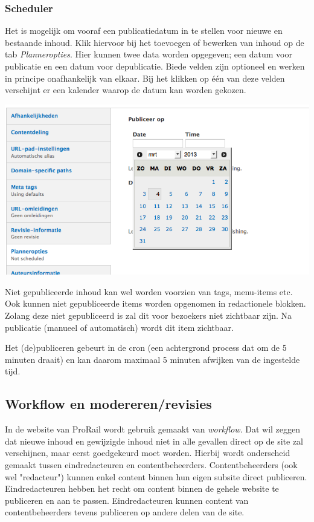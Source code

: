 \subsubsection{Scheduler}
Het is mogelijk om vooraf een publicatiedatum in te stellen voor nieuwe en bestaande inhoud. Klik hiervoor bij het toevoegen of bewerken van inhoud op de tab \emph{Planneropties}. Hier kunnen twee data worden opgegeven; een datum voor publicatie en een datum voor depublicatie. Biede velden zijn optioneel en werken in principe onafhankelijk van elkaar. Bij het klikken op \'{e}\'{e}n van deze velden verschijnt er een kalender waarop de datum kan worden gekozen.
\begin{center}
\includegraphics[width=\textwidth]{img/scheduler.png}
\end{center}
Niet gepubliceerde inhoud kan wel worden voorzien van tags, menu-items etc. Ook kunnen niet gepubliceerde items worden opgenomen in redactionele blokken. Zolang deze niet gepubliceerd is zal dit voor bezoekers niet zichtbaar zijn. Na publicatie (manueel of automatisch) wordt dit item zichtbaar.

Het (de)publiceren gebeurt in de cron (een achtergrond process dat om de 5 minuten draait) en kan daarom maximaal 5 minuten afwijken van de ingestelde tijd.


\subsection{Workflow en modereren/revisies}\label{workflow}
In de website van ProRail wordt gebruik gemaakt van \emph{workflow}. Dat wil zeggen dat nieuwe inhoud en gewijzigde inhoud niet in alle gevallen direct op de site zal verschijnen, maar eerst goedgekeurd moet worden. Hierbij wordt onderscheid gemaakt tussen eindredacteuren en contentbeheerders. Contentbeheerders (ook wel "redacteur") kunnen enkel content binnen hun eigen subsite direct publiceren. Eindredacteuren hebben het recht om content binnen de gehele website te publiceren en aan te passen. Eindredacteuren kunnen content van contentbeheerders tevens publiceren op andere delen van de site.

